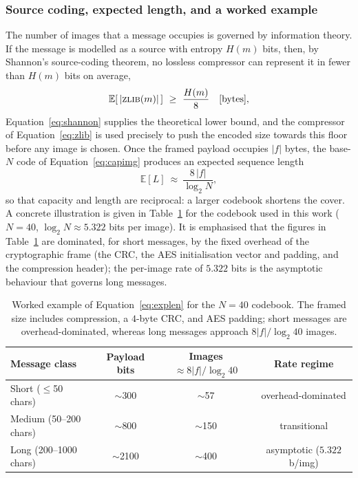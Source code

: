 \documentclass[10pt,a4paper]{article}
\theoremstyle{definition}
\begin{document}
\subsubsection{Source coding, expected length, and a worked example}\label{sec:worked}
The number of images that a message occupies is governed by information theory. If
the message is modelled as a source with entropy $H(m)$ bits, then, by Shannon's
source-coding theorem, no lossless compressor can represent it in fewer than
$H(m)$ bits on average,
\begin{equation}
  \mathbb{E}\!\left[\,|\textsc{zlib}(m)|\,\right]\ \ge\ \frac{H(m)}{8}\quad[\mathrm{bytes}],
  \label{eq:shannon}
\end{equation}
Equation~\eqref{eq:shannon} supplies the theoretical lower bound, and the compressor
of Equation~\eqref{eq:zlib} is used precisely to push the encoded size
towards this floor before any image is chosen. Once the framed payload occupies
$|f|$ bytes, the base-$N$ code of Equation~\eqref{eq:capimg} produces an expected sequence
length
\begin{equation}
  \mathbb{E}[L]\ \approx\ \frac{8\,|f|}{\log_2 N},
  \label{eq:explen}
\end{equation}
so that capacity and length are reciprocal: a larger codebook shortens the cover.
A concrete illustration is given in Table~\ref{tab:worked} for the codebook used in this
work ($N=40$, $\log_2 N\approx 5.322$ bits per image). It is emphasised that the
figures in Table~\ref{tab:worked} are dominated, for short messages, by the fixed
overhead of the cryptographic frame (the CRC, the AES initialisation vector and
padding, and the compression header); the per-image rate of $5.322$ bits is the
asymptotic behaviour that governs long messages.

\begin{table}[t]
\centering
\caption{Worked example of Equation~\eqref{eq:explen} for the $N=40$ codebook. The framed size
includes compression, a $4$-byte CRC, and AES padding; short messages are
overhead-dominated, whereas long messages approach $8|f|/\log_2 40$ images.}\label{tab:worked}
\begin{tabular}{@{}lccc@{}}
\toprule
Message class & Payload bits & Images $\approx 8|f|/\log_2 40$ & Rate regime \\
\midrule
Short ($\le$50 chars)  & $\sim$300  & $\sim$57  & overhead-dominated \\
Medium (50--200 chars) & $\sim$800  & $\sim$150 & transitional \\
Long (200--1000 chars) & $\sim$2100 & $\sim$400 & asymptotic ($5.322$ b/img) \\
\bottomrule
\end{tabular}
\end{table}
\end{document}
